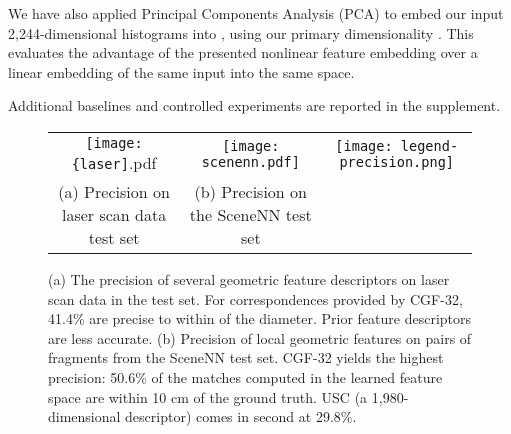 We have also applied Principal Components Analysis (PCA) to embed our input 2,244-dimensional histograms into , using our primary dimensionality . This evaluates the advantage of the presented nonlinear feature embedding over a linear embedding of the same input into the same space.

Additional baselines and controlled experiments are reported in the supplement.



\begin{figure*}[!t]
\centering
\begin{minipage}{0.97\textwidth}
\centering
\begin{tabular}{c c c}
    \texttt{[image: \{laser]}.pdf} &
    \texttt{[image: scenenn.pdf]} &
    \texttt{[image: legend-precision.png]}\\
     \small{(a) Precision on laser scan data test set} & \small{(b) Precision on the SceneNN test set} & \\
\end{tabular}
\end{minipage}\hfill
\vspace{1mm}
\caption{(a) The precision of several geometric feature descriptors on laser scan data in the test set. For correspondences provided by CGF-32, 41.4\% are precise to within  of the diameter. Prior feature descriptors are less accurate. (b) Precision of local geometric features on pairs of fragments from the SceneNN test set. CGF-32 yields the highest precision: 50.6\% of the matches computed in the learned feature space are within 10 cm of the ground truth. USC (a \mbox{1,980-dimensional} descriptor) comes in second at 29.8\%.}
\label{fig:precision}
\vspace{-1mm}
\end{figure*}

